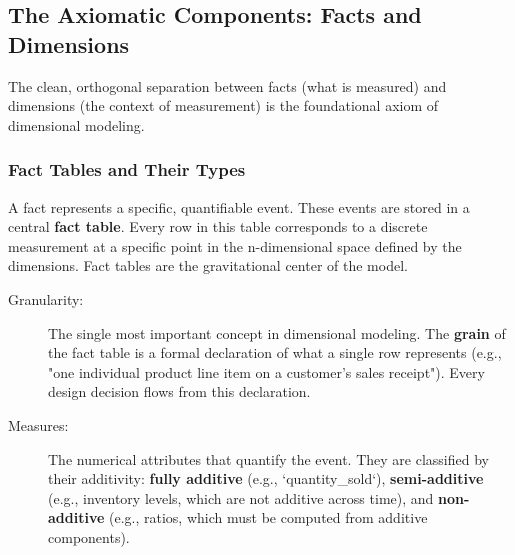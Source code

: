 \subsection{The Axiomatic Components: Facts and Dimensions}
The clean, orthogonal separation between facts (what is measured) and dimensions (the context of measurement) is the foundational axiom of dimensional modeling.

\subsubsection{Fact Tables and Their Types}
A fact represents a specific, quantifiable event. These events are stored in a central \textbf{fact table}. Every row in this table corresponds to a discrete measurement at a specific point in the n-dimensional space defined by the dimensions. Fact tables are the gravitational center of the model.

\begin{description}
    \item[Granularity:] The single most important concept in dimensional modeling. The \textbf{grain} of the fact table is a formal declaration of what a single row represents (e.g., "one individual product line item on a customer's sales receipt"). Every design decision flows from this declaration.
    \item[Measures:] The numerical attributes that quantify the event. They are classified by their additivity: \textbf{fully additive} (e.g., `quantity\_sold`), \textbf{semi-additive} (e.g., inventory levels, which are not additive across time), and \textbf{non-additive} (e.g., ratios, which must be computed from additive components).
\end{description}

